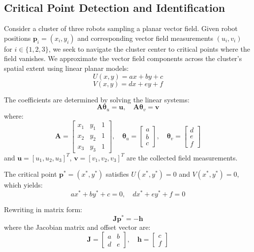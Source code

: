 \documentclass[lettersize,journal]{IEEEtran}
\begin{document}
\subsection{Critical Point Detection and Identification}
\noindent
Consider a cluster of three robots sampling a planar vector field. Given robot positions $\mathbf{p}_i = (x_i, y_i)$ and corresponding vector field measurements $(u_i, v_i)$ for $i \in \{1, 2, 3\}$, we seek to navigate the cluster center to critical points where the field vanishes.
We approximate the vector field components across the cluster's spatial extent using linear planar models:
\begin{equation}
U(x,y) = ax + by + c
\end{equation}
\begin{equation}
V(x,y) = dx + ey + f
\end{equation}

The coefficients are determined by solving the linear systems:
\begin{equation}
\mathbf{A}\boldsymbol{\theta}_u = \mathbf{u}, \quad \mathbf{A}\boldsymbol{\theta}_v = \mathbf{v}
\end{equation}
where:
\begin{equation}
\mathbf{A} = \begin{bmatrix} x_1 & y_1 & 1 \\ x_2 & y_2 & 1 \\ x_3 & y_3 & 1 \end{bmatrix}, \quad \boldsymbol{\theta}_u = \begin{bmatrix} a \\ b \\ c \end{bmatrix}, \quad \boldsymbol{\theta}_v = \begin{bmatrix} d \\ e \\ f \end{bmatrix}
\end{equation}
and $\mathbf{u} = [u_1, u_2, u_3]^T$, $\mathbf{v} = [v_1, v_2, v_3]^T$ are the collected field measurements.

The critical point $\mathbf{p}^* = (x^*, y^*)$ satisfies $U(x^*, y^*) = 0$ and $V(x^*, y^*) = 0$, which yields:
\begin{equation}
ax^* + by^* + c = 0, \quad dx^* + ey^* + f = 0
\end{equation}

Rewriting in matrix form:
\begin{equation}
\mathbf{J}\mathbf{p}^* = -\mathbf{h}
\end{equation}
where the Jacobian matrix and offset vector are:
\begin{equation}
\mathbf{J} = \begin{bmatrix} a & b \\ d & e \end{bmatrix}, \quad \mathbf{h} = \begin{bmatrix} c \\ f \end{bmatrix}
\end{equation}
\end{document}
